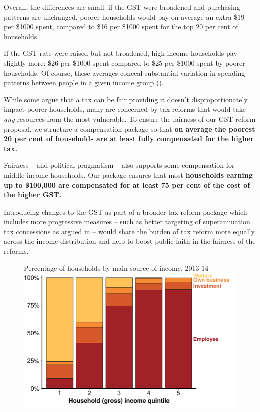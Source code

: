 Overall, the differences are small: if the GST were broadened and purchasing patterns are unchanged, poorer households would pay on average an extra \$19 per \$1000 spent, compared to \$16 per \$1000 spent for the top 20 per cent of households. 

If the GST rate were raised but not broadened, high-income households pay slightly more:  \$26 per \$1000 spent compared to \$25 per \$1000 spent by poorer households. Of course, these averages conceal substantial variation in spending patterns between people in a given income group ().

While some argue that a tax can be fair providing it doesn’t disproportionately impact poorer households, many are concerned by tax reforms that would take \emph{any} resources from the most vulnerable. To ensure the fairness of our GST reform proposal, we structure a compensation package so that \textbf{on average the poorest 20 per cent of households are at least fully compensated for the higher tax.} 

Fairness – and political pragmatism – also supports some compensation for middle income households. Our package ensures that most \textbf{households earning up to \$100,000 are compensated for at least 75 per cent of the cost of the higher GST.}

Introducing changes to the GST as part of a broader tax reform package which includes more progressive measures – such as better targeting of superannuation tax concessions as argued in  – would share the burden of tax reform more equally across the income distribution and help to boost public faith in the fairness of the reforms. 

\begin{figure}[tb]
%
{Percentage of households by main source of income, 2013-14}
\includegraphics[width=\columnwidth]{atlas/figure/GST-Figure-5-1.pdf}
\end{figure}

